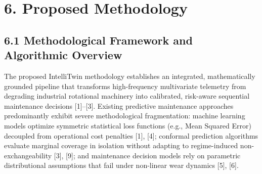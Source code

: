 \documentclass[12pt,a4paper]{article}
\begin{document}
\section*{6. Proposed Methodology}

\subsection*{6.1 Methodological Framework and Algorithmic Overview}
The proposed IntelliTwin methodology establishes an integrated, mathematically grounded pipeline that transforms high-frequency multivariate telemetry from degrading industrial rotational machinery into calibrated, risk-aware sequential maintenance decisions [1]--[3]. Existing predictive maintenance approaches predominantly exhibit severe methodological fragmentation: machine learning models optimize symmetric statistical loss functions (e.g., Mean Squared Error) decoupled from operational cost penalties [1], [4]; conformal prediction algorithms evaluate marginal coverage in isolation without adapting to regime-induced non-exchangeability [3], [9]; and maintenance decision models rely on parametric distributional assumptions that fail under non-linear wear dynamics [5], [6].
\end{document}

